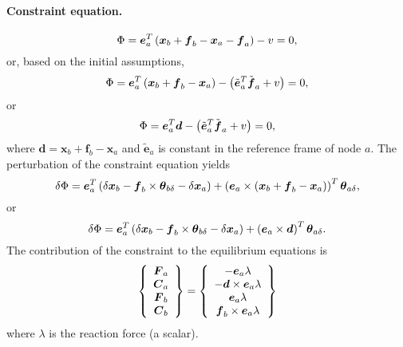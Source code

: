 \documentclass[10pt,dvips,fleqn,subeqn]{report}
\newcommand{\T}[1]{\boldsymbol{#1}}
\begin{document}
\paragraph{Constraint equation.}
\begin{equation}
	\Phi = \T{e}_a^T \plbr{\T{x}_b + \T{f}_b - \T{x}_a - \T{f}_a} - v = 0 ,
\end{equation}
or, based on the initial assumptions,
\begin{equation}
	\Phi = \T{e}_a^T \plbr{\T{x}_b + \T{f}_b - \T{x}_a}
		- \plbr{\tilde{\T{e}}_a^T \tilde{\T{f}}_a + v} = 0 ,
\end{equation}
or
\begin{equation}
	\Phi = \T{e}_a^T \T{d}
		- \plbr{\tilde{\T{e}}_a^T \tilde{\T{f}}_a + v} = 0 ,
\end{equation}
where $\T{d}=\T{x}_b + \T{f}_b - \T{x}_a$ 
and $\tilde{\T{e}}_a$ is constant in the reference frame of node $a$.
The perturbation of the constraint equation yields
\begin{equation}
	\delta\Phi = 
		\T{e}_a^T \plbr{\delta\T{x}_b
		- \T{f}_b\times\T{\theta}_{b\delta}
		- \delta\T{x}_a
		} + \plbr{\T{e}_a \times \plbr{
			\T{x}_b + \T{f}_b - \T{x}_a
		}}^T \T{\theta}_{a\delta} ,
\end{equation}
or
\begin{equation}
	\delta\Phi = 
		\T{e}_a^T \plbr{\delta\T{x}_b
		- \T{f}_b\times\T{\theta}_{b\delta}
		- \delta\T{x}_a
		} + \plbr{\T{e}_a \times \T{d}}^T \T{\theta}_{a\delta} .
\end{equation}
The contribution of the constraint to the equilibrium equations is
\begin{equation}
	\cubr{\cvvect{
		\T{F}_a \\
		\T{C}_a \\
		\T{F}_b \\
		\T{C}_b
	}} = \cubr{\cvvect{
		- \T{e}_a \lambda \\
		- \T{d} \times \T{e}_a \lambda \\
		\T{e}_a \lambda \\
		\T{f}_b \times \T{e}_a \lambda
	}}
\end{equation}
where $\lambda$ is the reaction force (a scalar).
\end{document}
